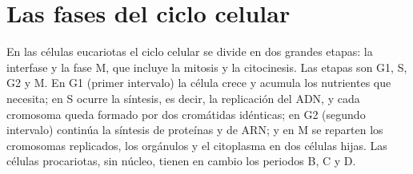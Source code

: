 \documentclass{book}
\begin{document}
\section{Las fases del ciclo celular}

En las células eucariotas el ciclo celular se divide en dos grandes etapas: la interfase y la fase M, que incluye la mitosis y la citocinesis. Las etapas son G1, S, G2 y M. En G1 (primer intervalo) la célula crece y acumula los nutrientes que necesita; en S ocurre la síntesis, es decir, la replicación del ADN, y cada cromosoma queda formado por dos cromátidas idénticas; en G2 (segundo intervalo) continúa la síntesis de proteínas y de ARN; y en M se reparten los cromosomas replicados, los orgánulos y el citoplasma en dos células hijas. Las células procariotas, sin núcleo, tienen en cambio los periodos B, C y D.

\end{document}
